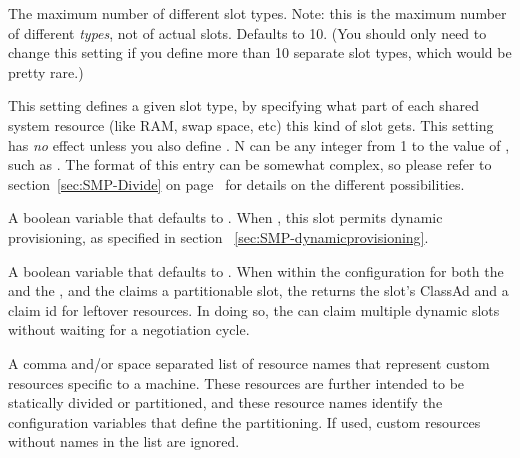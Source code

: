 \begin{description}

\label{param:MaxSlotTypes}
\item[\Macro{MAX\_SLOT\_TYPES}]
  The maximum number of different slot types.  
  Note: this is the maximum number of different \emph{types}, not of
  actual slots.
  Defaults to 10.  
  (You should only need to change this setting if you define more than
  10 separate slot types, which would be pretty rare.)

\label{param:SlotTypeN}
\item[\Macro{SLOT\_TYPE\_<N>}]
  This setting defines a given slot type, by specifying
  what part of each shared system resource (like RAM, swap space, etc)
  this kind of slot gets.  This setting has \emph{no} effect unless you also
  define .
  N can be any integer from 1 to the value of
  , such as
  . 
  The format of this entry can be somewhat complex, so please refer to
  section~\ref{sec:SMP-Divide} on page~\pageref{sec:SMP-Divide} for
  details on the different possibilities.

\label{param:SlotTypeNPartitionable}
\item[\Macro{SLOT\_TYPE\_<N>\_PARTITIONABLE}]
  A boolean variable that defaults to .
  When , this slot permits dynamic provisioning, as specified in
  section~ \ref{sec:SMP-dynamicprovisioning}.

\label{param:ClaimPartitionableLeftovers}
\item[\Macro{CLAIM\_PARTITIONABLE\_LEFTOVERS}]
  A boolean variable that defaults to .
  When  within the configuration for both the 
  and the , 
  and the  claims a partitionable slot,
  the  returns the slot's ClassAd and a claim id for
  leftover resources.
  In doing so, the  can claim multiple dynamic slots 
  without waiting for a negotiation cycle.

\label{param:MachineResourceNames}
\item[\Macro{MACHINE\_RESOURCE\_NAMES}]
  A comma and/or space separated list of resource names that represent
  custom resources specific to a machine.
  These resources are further intended to be statically divided or
  partitioned, and these resource names identify the configuration variables
  that define the partitioning.
  If used, custom resources without names in the list are ignored.


\end{description}
